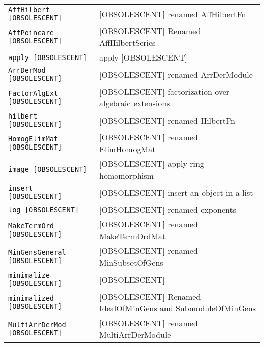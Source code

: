 \documentclass[a4paper]{mybook}
\begin{document}
\begin{center}
\begin{longtable}{ll}
    
{\verb~AffHilbert [OBSOLESCENT]~} &
      [OBSOLESCENT] renamed AffHilbertFn\\
   
{\verb~AffPoincare [OBSOLESCENT]~} &
      [OBSOLESCENT] Renamed AffHilbertSeries\\
   
{\verb~apply [OBSOLESCENT]~} &
      apply [OBSOLESCENT]\\
   
{\verb~ArrDerMod [OBSOLESCENT]~} &
      [OBSOLESCENT] renamed ArrDerModule\\
   
{\verb~FactorAlgExt [OBSOLESCENT]~} &
      [OBSOLESCENT] factorization over algebraic extensions\\
   
{\verb~hilbert [OBSOLESCENT]~} &
      [OBSOLESCENT] renamed HilbertFn\\
   
{\verb~HomogElimMat [OBSOLESCENT]~} &
      [OBSOLESCENT] renamed ElimHomogMat\\
   
{\verb~image [OBSOLESCENT]~} &
      [OBSOLESCENT] apply ring homomorphism\\
   
{\verb~insert [OBSOLESCENT]~} &
      [OBSOLESCENT] insert an object in a list\\
   
{\verb~log [OBSOLESCENT]~} &
      [OBSOLESCENT] renamed exponents\\
   
{\verb~MakeTermOrd [OBSOLESCENT]~} &
      [OBSOLESCENT] renamed MakeTermOrdMat\\
   
{\verb~MinGensGeneral [OBSOLESCENT]~} &
      [OBSOLESCENT] renamed MinSubsetOfGens\\
   
{\verb~minimalize [OBSOLESCENT]~} &
      [OBSOLESCENT]\\
   
{\verb~minimalized [OBSOLESCENT]~} &
      [OBSOLESCENT] Renamed IdealOfMinGens and SubmoduleOfMinGens\\
   
{\verb~MultiArrDerMod [OBSOLESCENT]~} &
      [OBSOLESCENT] renamed MultiArrDerModule\\
   

\end{longtable}
\end{center}
\end{document}
